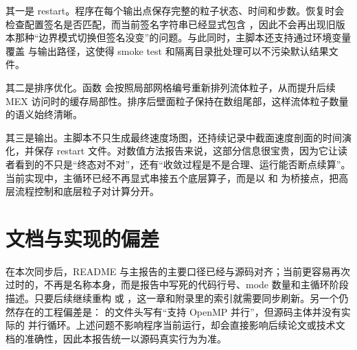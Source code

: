 其一是 restart。程序在每个输出点保存完整的粒子状态、时间和步数。恢复时会检查配置签名是否匹配，而当前签名字符串已经显式包含 ，因此不会再出现旧版本那种“边界模式切换但签名没变”的问题。与此同时，主脚本还支持通过环境变量覆盖  与输出路径，这使得 smoke test 和隔离目录批处理可以不污染默认结果文件。

其二是排序优化。函数  会按照局部网格编号重新排列流体粒子，从而提升后续 MEX 访问时的缓存局部性。排序后壁面粒子保持在数组尾部，这样流体粒子数量  的语义始终清晰。

其三是输出。主脚本不只生成最终速度场图，还持续记录中截面速度剖面的时间演化，并保存 restart 文件。对数值方法报告来说，这部分信息很宝贵，因为它让读者看到的不只是“终态对不对”，还有“收敛过程是不是合理、运行能否断点续算”。当前实现中，主循环已经不再显式串接五个底层算子，而是以  和  为桥接点，把高层流程控制和底层粒子对计算分开。

\section{文档与实现的偏差}
在本次同步后，README 与主报告的主要口径已经与源码对齐；当前更容易再次过时的，不再是名称本身，而是报告中写死的代码行号、mode 数量和主循环阶段描述。只要后续继续重构  或 ，这一章和附录里的索引就需要同步刷新。另一个仍然存在的工程偏差是： 的文件头写有“支持 OpenMP 并行”，但源码主体并没有实际的  并行循环。上述问题不影响程序当前运行，却会直接影响后续论文或技术文档的准确性，因此本报告统一以源码真实行为为准。
